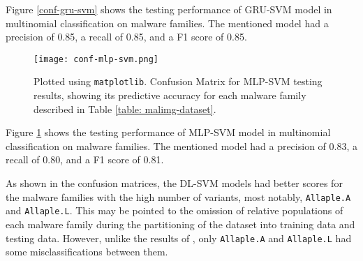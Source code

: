 \documentclass[sigconf]{acmart}
\begin{document}
Figure \ref{conf-gru-svm} shows the testing performance of GRU-SVM model in multinomial classification on malware families. The mentioned model had a precision of 0.85, a recall of 0.85, and a F1 score of 0.85.

\begin{figure}[!htb]
	\centering
		\texttt{[image: conf-mlp-svm.png]}
		\caption{Plotted using \texttt{matplotlib}\cite{Hunter:2007}. Confusion Matrix for MLP-SVM testing results, showing its predictive accuracy for each malware family described in Table \ref{table: malimg-dataset}.}
		\label{conf-mlp-svm}
	\endminipage\hfill
\end{figure}

Figure \ref{conf-mlp-svm} shows the testing performance of MLP-SVM model in multinomial classification on malware families. The mentioned model had a precision of 0.83, a recall of 0.80, and a F1 score of 0.81.

As shown in the confusion matrices, the DL-SVM models had better scores for the malware families with the high number of variants, most notably, \texttt{Allaple.A} and \texttt{Allaple.L}. This may be pointed to the omission of relative populations of each malware family during the partitioning of the dataset into training data and testing data. However, unlike the results of \cite{garcia2016random}, only \texttt{Allaple.A} and \texttt{Allaple.L} had some misclassifications between them.
\end{document}
